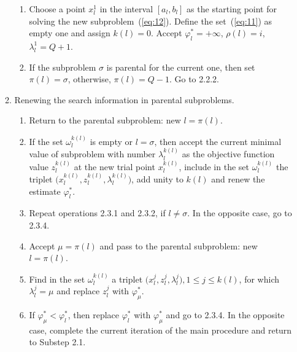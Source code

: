 \documentclass[smallextended]{svjour3}
\let\origref\ref
\renewcommand{\ref}[1]{(\origref{#1})}
\begin{document}
\begin{enumerate}[label=\bfseries Step \arabic*., leftmargin=*]
\begin{enumerate}[label=\arabic{enumi}.\arabic*., leftmargin=-2em]
\begin{enumerate}[label=\arabic{enumi}.\arabic{enumii}.\arabic*., leftmargin=*]
      \item Choose a point $x_l^1$ in the interval $[a_l, b_l]$ as the starting point for solving the new subproblem~\ref{eq:12}. Define the set~\ref{eq:11} as empty one and assign $k(l) = 0$. Accept $\varphi_l^* = +\infty$, $\rho(l) = i$, $\lambda_l^1 = Q + 1$.

      \item If the subproblem $\sigma$ is parental for the current one, then set $\pi(l) = \sigma$, otherwise, $\pi(l) = Q - 1$. Go to 2.2.2.
    \end{enumerate}

    \item Renewing the search information in parental subproblems.
    \begin{enumerate}[label=\arabic{enumi}.\arabic{enumii}.\arabic*., leftmargin=*]
      \item Return to the parental subproblem: new $l = \pi(l)$.

      \item If the set $\omega_l^{k(l)}$ is empty or $l = \sigma$, then accept the current minimal value of subproblem with number $\lambda_l^{k(l)}$ as the objective function value $z_l^{k(l)}$ at the new trial point $x_l^{k(l)}$, include in the set $\omega_l^{k(l)}$ the triplet $\big( x_l^{k(l)}, z_l^{k(l)}, \lambda_l^{k(l)} \big)$, add unity to $k(l)$ and renew the estimate $\varphi_l^*$.

      \item Repeat operations 2.3.1 and 2.3.2, if $l \neq \sigma$. In the opposite case, go to 2.3.4.

      \item Accept $\mu = \pi(l)$ and pass to the parental subproblem: new $l = \pi(l)$.

      \item Find in the set $\omega_l^{k(l)}$ a triplet $\big( x_l^j, z_l^j, \lambda_l^j \big), 1 \leq j \leq k(l)$, for which $\lambda_l^j = \mu$ and replace $z_l^j$ with $\varphi_{\mu}^*$.

      \item If $\varphi_{\mu}^* < \varphi_l^*$, then replace $\varphi_l^*$ with $\varphi_{\mu}^*$ and go to 2.3.4. In the opposite case, complete the current iteration of the main procedure and return to Substep 2.1.

    \end{enumerate}
  \end{enumerate}
\end{enumerate}
\end{document}
